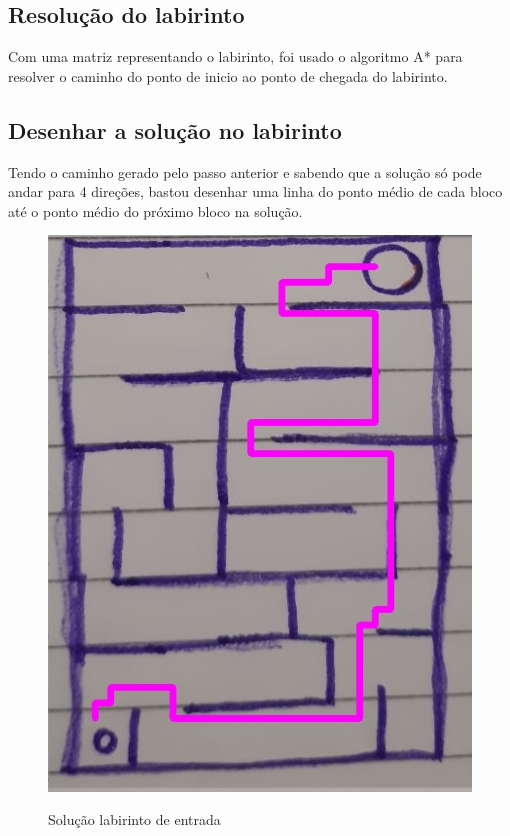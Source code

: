\documentclass[conference]{IEEEtran}
\begin{document}
\subsection{Resolução do labirinto}
Com uma matriz representando o labirinto, foi usado o algoritmo A* para resolver o caminho do ponto de inicio ao ponto de chegada do labirinto.
\subsection{Desenhar a solução no labirinto}
Tendo o caminho gerado pelo passo anterior e sabendo que a solução só pode andar para 4 direções, bastou desenhar uma linha do ponto médio de cada bloco até o ponto médio do próximo bloco na solução.
\begin{figure}[h!]
   \centering
    {\includegraphics[scale=0.3]{solutionmedium.jpg}
    \label{fig:solutionmedium}
    \caption{Solução labirinto de entrada}
    }
\end{figure}
\end{document}
